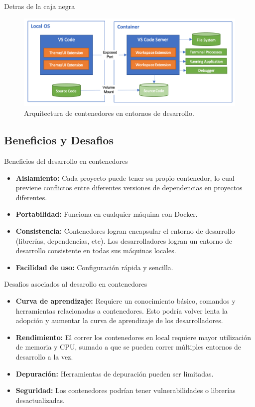\documentclass{beamer}
\begin{document}
\begin{frame}{Detras de la caja negra}
  \begin{figure}
    \centering
    \includegraphics[width=\textwidth]{images/architecture-containers.png}
    \caption{Arquitectura de contenedores en entornos de desarrollo.}
  \end{figure}
\end{frame}

\subsection{Beneficios y Desafios}
\begin{frame}{Beneficios del desarrollo en contenedores}
  \begin{itemize}
    \item \textbf{Aislamiento:} Cada proyecto puede tener su propio contenedor, lo cual previene conflictos entre diferentes versiones de dependencias en proyectos diferentes.
    \item \textbf{Portabilidad:} Funciona en cualquier máquina con Docker.
    \item \textbf{Consistencia:} Contenedores logran encapsular el entorno de desarrollo (librerías, dependencias, etc). Los desarrolladores logran un entorno de desarrollo consistente en todas sus máquinas locales.
    \item \textbf{Facilidad de uso:} Configuración rápida y sencilla.
  \end{itemize}
\end{frame}

\begin{frame}{Desafios asociados al desarollo en contenedores}
  \begin{itemize}
    \item \textbf{Curva de aprendizaje:} Requiere un conocimiento básico, comandos y herramientas relacionadas a contenedores. Esto podría volver lenta la adopción y aumentar la curva de aprendizaje de los desarrolladores.
    \item \textbf{Rendimiento:} El correr los contenedores en local requiere mayor utilización de memoria y CPU, sumado a que se pueden correr múltiples entornos de desarrollo a la vez.
    \item \textbf{Depuración:} Herramientas de depuración pueden ser limitadas.
    \item \textbf{Seguridad:} Los contenedores podrían tener vulnerabilidades o librerías desactualizadas.
  \end{itemize}
\end{frame}
\end{document}
